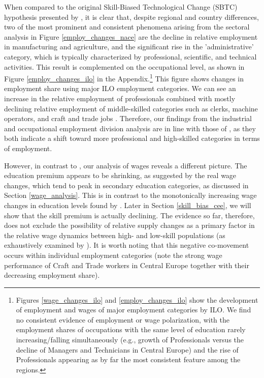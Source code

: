 \documentclass[11pt]{article}
\begin{document}
When compared to the original Skill-Biased Technological Change (SBTC) hypothesis presented by \cite{katz1992changes}, it is clear that, despite regional and country differences, two of the most prominent and consistent phenomena arising from the sectoral analysis in Figure \ref{employ_changes_nace} are the decline in relative employment in manufacturing and agriculture, and the significant rise in the 'administrative' category, which is typically characterized by professional, scientific, and technical activities. This result is complemented on the occupational level, as shown in Figure \ref{employ_changes_ilo} in the Appendix.\footnote{Figures \ref{wage_changes_ilo} and \ref{employ_changes_ilo} show the development of employment and wages of major employment categories by ILO. We find no consistent evidence of employment or wage polarization, with the employment shares of occupations with the same level of education rarely increasing/falling simultaneously (e.g., growth of Professionals versus the decline of Managers and Technicians in Central Europe) and the rise of Professionals appearing as by far the most consistent feature among the regions.} This figure shows changes in employment share using major ILO employment categories. We can see an increase in the relative employment of professionals combined with mostly declining relative employment of middle-skilled categories such as clerks, machine operators, and craft and trade jobs \citep{acemoglu2011skills}. Therefore, our findings from the industrial and occupational employment division analysis are in line with those of \cite{katz1992changes}, as they both indicate a shift toward more professional and high-skilled categories in terms of employment.

However, in contrast to \citeauthor{katz1992changes}, our analysis of wages reveals a different picture. The education premium appears to be shrinking, as suggested by the real wage changes, which tend to peak in secondary education categories, as discussed in Section \ref{wage_analysis}. This is in contrast to the monotonically increasing wage changes in education levels found by \citeauthor{katz1992changes}. Later in Section \ref{skill_bias_cee}, we will show that the skill premium is actually declining. The evidence so far, therefore, does not exclude the possibility of relative supply changes as a primary factor in the relative wage dynamics between high- and low-skill populations (as exhaustively examined by \citet{katz1992changes}). It is worth noting that this negative co-movement occurs within individual employment categories (note the strong wage performance of Craft and Trade workers in Central Europe together with their decreasing employment share).
\end{document}
